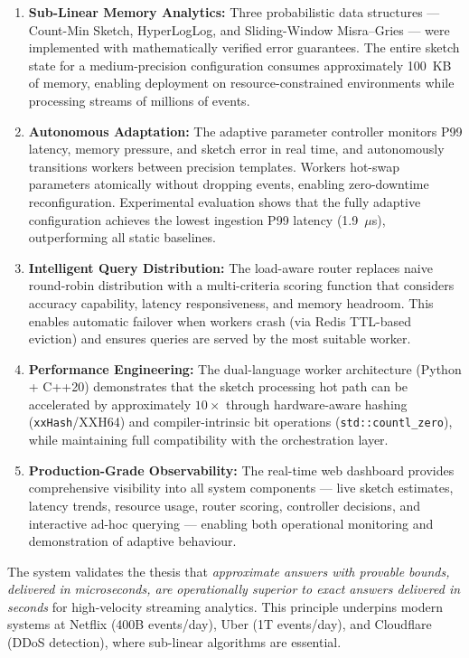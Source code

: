 \begin{enumerate}
    \item \textbf{Sub-Linear Memory Analytics:} Three probabilistic data structures — Count-Min Sketch, HyperLogLog, and Sliding-Window Misra--Gries — were implemented with mathematically verified error guarantees. The entire sketch state for a medium-precision configuration consumes approximately 100~KB of memory, enabling deployment on resource-constrained environments while processing streams of millions of events.

    \item \textbf{Autonomous Adaptation:} The adaptive parameter controller monitors P99 latency, memory pressure, and sketch error in real time, and autonomously transitions workers between precision templates. Workers hot-swap parameters atomically without dropping events, enabling zero-downtime reconfiguration. Experimental evaluation shows that the fully adaptive configuration achieves the lowest ingestion P99 latency (1.9~$\mu$s), outperforming all static baselines.

    \item \textbf{Intelligent Query Distribution:} The load-aware router replaces naive round-robin distribution with a multi-criteria scoring function that considers accuracy capability, latency responsiveness, and memory headroom. This enables automatic failover when workers crash (via Redis TTL-based eviction) and ensures queries are served by the most suitable worker.

    \item \textbf{Performance Engineering:} The dual-language worker architecture (Python + C++20) demonstrates that the sketch processing hot path can be accelerated by approximately $10\times$ through hardware-aware hashing (\texttt{xxHash}/XXH64) and compiler-intrinsic bit operations (\texttt{std::countl\_zero}), while maintaining full compatibility with the orchestration layer.

    \item \textbf{Production-Grade Observability:} The real-time web dashboard provides comprehensive visibility into all system components — live sketch estimates, latency trends, resource usage, router scoring, controller decisions, and interactive ad-hoc querying — enabling both operational monitoring and demonstration of adaptive behaviour.
\end{enumerate}

The system validates the thesis that \textit{approximate answers with provable bounds, delivered in microseconds, are operationally superior to exact answers delivered in seconds} for high-velocity streaming analytics. This principle underpins modern systems at Netflix (400B events/day), Uber (1T events/day), and Cloudflare (DDoS detection), where sub-linear algorithms are essential.



